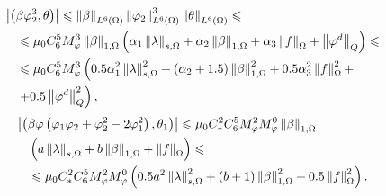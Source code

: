 \begin{equation}
	\label{3.21arn}
	\begin{split}
		&\left\vert  \left( \beta \varphi_2^3, \theta \right)  \right\vert 
		\leqslant 
			\left\Vert \beta \right\Vert_{L^6(\Omega)} 
			\left\Vert \varphi_2 \right\Vert^3_{L^6(\Omega)} 
			\left\Vert \theta \right\Vert_{L^6(\Omega)} 
		\leqslant \\
		&\quad\leqslant 
			\mu_0 
			C_6^5 
			M_\varphi^3 
			\left\Vert \beta \right\Vert_{1,\Omega}  
			\left( 
				\alpha_1 \left\Vert \lambda \right\Vert_{s,\Omega} 
				+ \alpha_2 \left\Vert \beta \right\Vert_{1,\Omega} 
				+ \alpha_3 \left\Vert f \right\Vert_\Omega 
				+ \left\Vert \varphi^d \right\Vert_Q
			 \right) 
		\leqslant \\
		&\quad\leqslant 
			\mu_0 
			C_6^5 
			M_\varphi^3
			\left(  
				0.5 \alpha_1^2 
				\left\Vert \lambda \right\Vert_{s,\Omega}^2 
				+ \left( \alpha_2 + 1.5 \right) 
				\left\Vert \beta \right\Vert_{1,\Omega}^2 
				+ 0.5 \alpha_3^2 
				\left\Vert f \right\Vert_\Omega^2 + \right. \\
				&\quad\left. + 0.5 
				\left\Vert \varphi^d \right\Vert_Q^2
			 \right),
	\end{split}
\end{equation}
\begin{equation}
	\label{3.22arn}
	\begin{split}
		&\left\vert 
			\left( 
				\beta \varphi \left( \varphi_1 \varphi_2 + \varphi_2^2 - 2 \varphi_1^2 \right), \theta_1
			 \right)
		 \right\vert \leqslant 
			\mu_0 
			C_{*}^2 C_6^5 
			M_\varphi^2 M_\varphi^0 
			\left\Vert \beta \right\Vert_{1, \Omega} \\
			&\quad\left( 
				a \left\Vert \lambda \right\Vert_{s,\Omega} 
				+ b \left\Vert \beta \right\Vert_{1,\Omega} 
				+ \left\Vert f \right\Vert_\Omega 
			 \right) 
		\leqslant \\
		&\quad\leqslant 
			\mu_0 
			C_{*}^2 C_6^5 
			M_\varphi^2 M_\varphi^0
			\left( 
				0.5 a^2 
				\left\Vert \lambda \right\Vert_{s,\Omega}^2 
				+ (b + 1) 
				\left\Vert \beta \right\Vert_{1, \Omega}^2 
				+ 0.5 \left\Vert f \right\Vert_\Omega^2 
			 \right).
	\end{split}
\end{equation}

